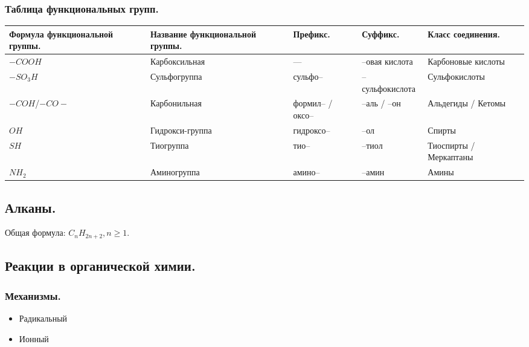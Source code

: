 \documentclass[12pt]{article}
\begin{document}
	\subsubsection{Таблица функциональных групп.}
	\begin{xltabular}{\textwidth}{|X|X|X|X|X|}
		\hline
		Формула функциональной группы. & Название функциональной группы. & Префикс. & Суффикс. & Класс соединения. \\
		\hline
		$-COOH$ & Карбоксильная & --- & --овая кислота & Карбоновые кислоты \\
		\hline
		$-SO_3H$ & Сульфогруппа & сульфо-- & --сульфокислота & Сульфокислоты \\
		\hline
		$-COH$/$-CO-$ & Карбонильная & формил-- / оксо-- & --аль / --он & Альдегиды / Кетомы \\
		\hline
		$OH$ & Гидрокси-группа & гидроксо-- & --ол & Спирты \\
		\hline
		$SH$ & Тиогруппа & тио-- & --тиол & Тиоспирты / Меркаптаны \\
		\hline
		$NH_2$ & Аминогруппа & амино-- & --амин & Амины \\
		\hline
	\end{xltabular}
	\subsection{Алканы.}
	Общая формула: $C_nH_{2n + 2}, n \geqslant 1$.
	\subsection{Реакции в органической химии.}
	\subsubsection{Механизмы.}
	\begin{itemize}
		\item Радикальный
		\item Ионный
	\end{itemize}
\end{document}
